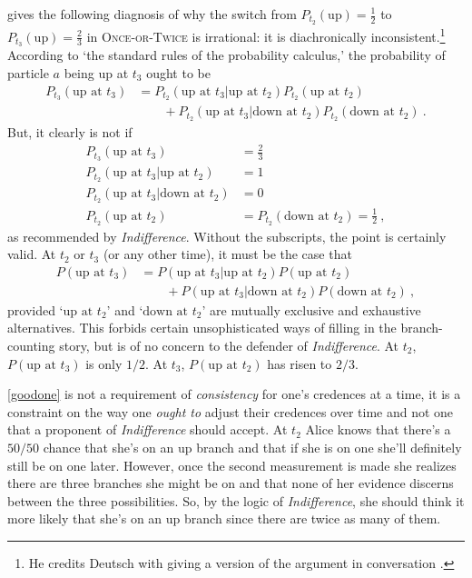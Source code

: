 \documentclass[12pt,onecolumn,secnumarabic,amsmath,amssymb,balancelastpage,nofootinbib]{article}
\begin{document}
\citet[]{wallace2012} gives the following diagnosis of why the switch from $P_{t_2}(\text{up})=\frac{1}{2}$ to $P_{t_3}(\text{up})=\frac{2}{3}$ in \textsc{Once-or-Twice} is irrational: it is diachronically inconsistent.\footnote{He credits Deutsch with giving a version of the argument in conversation \citep[][footnote 15]{wallace2013}.}  According to `the standard rules of the probability calculus,' the probability of particle $a$ being up at $t_3$ ought to be
\begin{align}
P_{t_3}(\text{up at }t_3)&=P_{t_2}(\text{up at }t_3|\text{up at }t_2)P_{t_2}(\text{up at }t_2)\nonumber\\
&\qquad +P_{t_2}(\text{up at }t_3|\text{down at }t_2)P_{t_2}(\text{down at }t_2) \ .
\label{goodone}
\end{align}
But, it clearly is not if
\begin{align}
P_{t_3}(\text{up at }t_3)&= \frac{2}{3}
\nonumber
\\
P_{t_2}(\text{up at }t_3|\text{up at }t_2)&= 1
\nonumber
\\
P_{t_2}(\text{up at }t_3|\text{down at }t_2)&= 0
\nonumber
\\
P_{t_2}(\text{up at }t_2)&= P_{t_2}(\text{down at }t_2)=\frac{1}{2}\ ,
\label{probs}
\end{align}
as recommended by \emph{Indifference}.  Without the subscripts, the point is certainly valid.  At $t_2$ or $t_3$ (or any other time), it must be the case that
\begin{align}
P(\text{up at }t_3)&=P(\text{up at }t_3|\text{up at }t_2)P(\text{up at }t_2)\nonumber\\
&\qquad +P(\text{up at }t_3|\text{down at }t_2)P(\text{down at }t_2) \ ,
\end{align}
provided `$\text{up at }t_2$' and `$\text{down at }t_2$' are mutually exclusive and exhaustive alternatives.  This forbids certain unsophisticated ways of filling in the branch-counting story, but is of no concern to the defender of \emph{Indifference}.  At $t_2$, $P(\text{up at }t_3)$ is only $1/2$. At $t_3$, $P(\text{up at }t_2)$ has risen to $2/3$.

\eqref{goodone} is not a requirement of \emph{consistency} for one's credences at a time, it is a constraint on the way one \emph{ought to} adjust their credences over time and not one that a proponent of \emph{Indifference} should accept.  At $t_2$ Alice knows that there's a $50/50$ chance that she's on an up branch and that if she is on one she'll definitely still be on one later.  However, once the second measurement is made she realizes there are three branches she might be on and that none of her evidence discerns between the three possibilities.  So, by the logic of \emph{Indifference}, she should think it more likely that she's on an up branch since there are twice as many of them.
\end{document}
